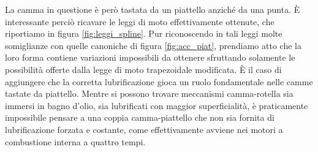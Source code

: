 \noindent La camma in questione \`e per\`o tastata da un piattello anzich\'e da una
punta. \`E interessante perci\`o ricavare le leggi di moto effettivamente
ottenute, che riportiamo in figura \ref{fig:leggi_spline}. 
Pur riconoscendo in tali leggi molte somiglianze con quelle canoniche di
figura \ref{fig:acc_piat}, prendiamo atto che la loro forma contiene variazioni
impossibili da ottenere
sfruttando solamente le possibilit\`a offerte dalla legge di moto trapezoidale
modificata.
\`E il caso di aggiungere che la corretta lubrificazione gioca un ruolo
fondamentale nelle camme tastate da piattello. Mentre si possono trovare
meccanismi camma-rotella sia immersi in bagno d'olio, sia lubrificati
con maggior superficialit\`a, \`e praticamente impossibile pensare a una
coppia camma-piattello che non sia fornita di lubrificazione forzata
e costante, come effettivamente avviene nei motori a combustione interna
a quattro tempi.
\newpage
\thispagestyle{empty}
\null
\endinput
